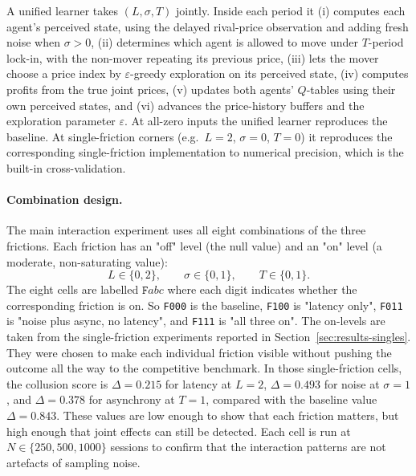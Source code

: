A unified learner takes $(L,\sigma,T)$ jointly. Inside each period it (i) computes each agent's perceived state, using the delayed rival-price observation and adding fresh noise when $\sigma>0$, (ii) determines which agent is allowed to move under $T$-period lock-in, with the non-mover repeating its previous price, (iii) lets the mover choose a price index by $\varepsilon$-greedy exploration on its perceived state, (iv) computes profits from the true joint prices, (v) updates both agents' $Q$-tables using their own perceived states, and (vi) advances the price-history buffers and the exploration parameter $\varepsilon$. At all-zero inputs the unified learner reproduces the baseline. At single-friction corners (e.g.\ $L=2$, $\sigma=0$, $T=0$) it reproduces the corresponding single-friction implementation to numerical precision, which is the built-in cross-validation.

\paragraph{Combination design.} The main interaction experiment uses all eight combinations of the three frictions. Each friction has an "off" level (the null value) and an "on" level (a moderate, non-saturating value):
\begin{equation*}
    L\in\{0,2\},\qquad \sigma\in\{0,1\},\qquad T\in\{0,1\}.
\end{equation*}
The eight cells are labelled $\texttt{F}abc$ where each digit indicates whether the corresponding friction is on. So \texttt{F000} is the baseline, \texttt{F100} is "latency only", \texttt{F011} is "noise plus async, no latency", and \texttt{F111} is "all three on". The on-levels are taken from the single-friction experiments reported in Section~\ref{sec:results-singles}. They were chosen to make each individual friction visible without pushing the outcome all the way to the competitive benchmark. In those single-friction cells, the collusion score is $\Delta=0.215$ for latency at $L=2$, $\Delta=0.493$ for noise at $\sigma=1$, and $\Delta=0.378$ for asynchrony at $T=1$, compared with the baseline value $\Delta=0.843$. These values are low enough to show that each friction matters, but high enough that joint effects can still be detected. Each cell is run at $N\in\{250,500,1000\}$ sessions to confirm that the interaction patterns are not artefacts of sampling noise.
